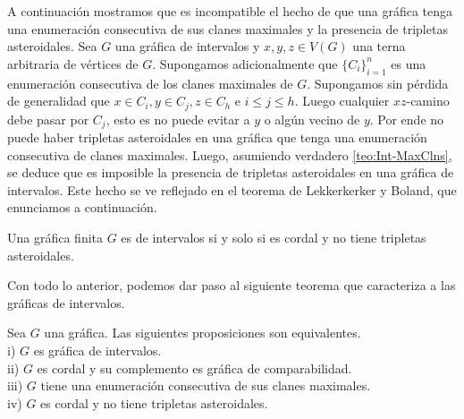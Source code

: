 A continuación mostramos que es incompatible el hecho de que una gráfica tenga una enumeración consecutiva de sus clanes maximales y la presencia de tripletas asteroidales. Sea $G$ una gráfica de intervalos y $x,y,z \in V(G)$ una terna arbitraria de vértices de $G$. Supongamos adicionalmente que $\{C_i\}_{i=1}^n$ es una enumeración consecutiva de los clanes maximales de $G$. Supongamos sin pérdida de generalidad que $x\in C_i, y \in C_j, z\in C_h$ e $i\leq j \leq h$. Luego cualquier $xz$-camino debe pasar por $C_j$, esto es no puede evitar a $y$ o algún vecino de $y$. Por ende no puede haber tripletas asteroidales en una gráfica que tenga una enumeración consecutiva de clanes maximales. Luego, asumiendo verdadero \cref{teo:Int-MaxClns}, se deduce que es imposible la presencia de tripletas asteroidales en una gráfica de intervalos. Este hecho se ve reflejado en el teorema de Lekkerkerker y Boland, que enunciamos a continuación.

\begin{teorema}
    \label{teo:Int-Ast-free}
    Una gráfica finita $G$ es de intervalos si y solo si es cordal y no tiene tripletas asteroidales.
\end{teorema}

Con todo lo anterior, podemos dar paso al siguiente teorema que caracteriza a las gráficas de intervalos.

\begin{teorema}
\label{teo:CarGrfsInt}
    Sea $G $ una gráfica. Las siguientes proposiciones son equivalentes.\\
    i) $G$ es gráfica de intervalos.\\
    ii) $G$ es cordal y su complemento es gráfica de comparabilidad.\\
    iii) $G$ tiene una enumeración consecutiva de sus clanes maximales.\\
    iv) $G$ es cordal y no tiene tripletas asteroidales. 
\end{teorema}

